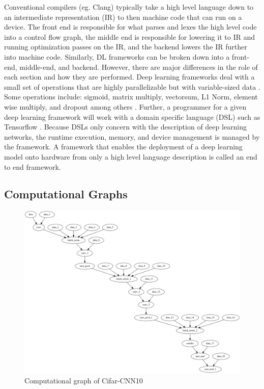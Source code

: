 Conventional compilers (eg. Clang) typically take a high level language down to
an intermediate representation (IR) to then machine code that can run on a
device.  The front end is responsible for what parses and lexes the high level
code into a control flow graph, the middle end is responsible for lowering it
to IR and running optimization passes on the IR, and the backend lowers the IR
further into machine code. Similarly, DL frameworks can be broken down into a
front-end, middle-end, and backend. However, there are major differences in the
role of each section and how they are performed.  Deep learning frameworks
deal with a small set of operations that are highly parallelizable but with
variable-sized data \cite{nGraph}. Some operations include: sigmoid, matrix
multiply, vectorsum, L1 Norm, element wise multiply, and dropout among others
\cite{cntk}. Further, a programmer for a given deep learning framework will
work with a domain specific language (DSL) such as Tensorflow
\cite{tensorflow}. Because DSLs only concern with the description of deep
learning networks, the runtime execution, memory, and device management is
managed by the framework. A framework that enables the deployment of a deep
learning model onto hardware from only a high level language description is
called an end to end framework.




\subsection{Computational Graphs}

\begin{figure}[th]
\centering
\includegraphics[scale=0.3]{Figures/cnn_smv_dataflow_graph.png}
\decoRule
\caption[cnn]{Computational graph of Cifar-CNN10}
\label{fig:comp_graph_cnn}
\end{figure}

